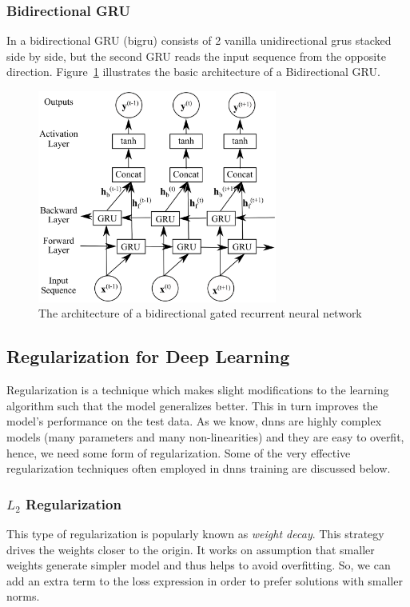 \subsubsection{Bidirectional GRU}
In a  bidirectional GRU (\gls{bigru}) consists of 2 vanilla unidirectional \gls{gru}s stacked side by side, but the second GRU reads the input sequence from the opposite direction. Figure~\ref{fig:bidirectional_gru} illustrates the basic architecture of a Bidirectional GRU. 
\begin{figure}[t]
	\centering
	\includegraphics[width=0.7\textwidth]{figures/bigru.eps}
	\caption{The architecture of a bidirectional gated recurrent neural network \label{fig:bidirectional_gru}}
\end{figure}


\subsection{Regularization for Deep Learning}
Regularization is a technique which makes slight modifications to the learning algorithm such that the model generalizes better. This in turn improves the model's performance on the test data. As we know, \gls{dnn}s are highly complex models (many parameters and many non-linearities) and they are easy to overfit, hence, we need some form of regularization. Some of the very effective regularization techniques often employed in \gls{dnn}s training are discussed below.


\subsubsection{$L_{2}$ Regularization}
This type of regularization is popularly known as \textit{weight decay}. This strategy drives the weights closer to the origin. It works on assumption that smaller weights generate simpler model and thus helps to avoid overfitting. So, we can add an extra term to the loss expression in order to prefer solutions with smaller norms.

